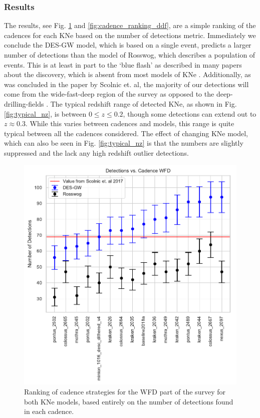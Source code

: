 \subsubsection{Results}
The results, see Fig. \ref{fig:cadence_ranking} and \ref{fig:cadence_ranking_ddf}, are a simple ranking of the cadences for each KNe based on the number of detections metric. Immediately we conclude the DES-GW model, which is based on a single event, predicts a larger number of detections than the model of Rosswog, which describes a population of events. This is at least in part to the `blue flash' as described in many papers about the discovery, which is absent from most models of KNe \citep{Villar2017b}. Additionally, as was concluded in the paper by Scolnic et. al, the majority of our detections will come from the wide-fast-deep region of the survey as opposed to the deep-drilling-fields \citep{Scolnic2017a}. The typical redshift range of detected KNe, as shown in Fig. \ref{fig:typical_nz}, is between $0 \leq z \leq 0.2$, though some detections can extend out to $z \approx 0.3$. While this varies between cadences and models, this range is quite typical between all the cadences considered. The effect of changing KNe model, which can also be seen in Fig. \ref{fig:typical_nz} is that the numbers are slightly suppressed and the lack any high redshift outlier detections.\par
\begin{figure}[h!]
  \centering
  \includegraphics[scale=0.7]{figures/wfd_detection_counts_by_cadence}
  \caption{Ranking of cadence strategies for the WFD part of the survey for both KNe models, based entirely on the number of detections found in each cadence.}
  \label{fig:cadence_ranking}
\end{figure}

